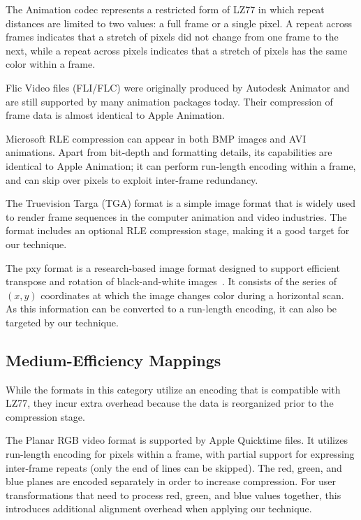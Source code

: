 The Animation codec represents a restricted form of LZ77 in which
repeat distances are limited to two values: a full frame or a single
pixel.  A repeat across frames indicates that a stretch of pixels did
not change from one frame to the next, while a repeat across pixels
indicates that a stretch of pixels has the same color within a frame.

Flic Video files (FLI/FLC) were originally produced by Autodesk
Animator and are still supported by many animation packages today.
Their compression of frame data is almost identical to Apple
Animation.

  Microsoft RLE compression can appear in
  both BMP images and AVI animations.  Apart from bit-depth and
  formatting details, its capabilities are identical to Apple
  Animation; it can perform run-length encoding within a frame, and
  can skip over pixels to exploit inter-frame redundancy.

 The Truevision Targa (TGA) format is a simple image
  format that is widely used to render frame sequences in the computer
  animation and video industries.  The format includes an optional RLE
  compression stage, making it a good target for our technique.

 The pxy format is a research-based image format
  designed to support efficient transpose and rotation of
  black-and-white images~\cite{shoji95}.  It consists of the series of
  $(x,y)$ coordinates at which the image changes color during a
  horizontal scan.  As this information can be converted to a
  run-length encoding, it can also be targeted by our technique.

\myend

\subsection*{Medium-Efficiency Mappings}
\label{sec:formats-med}

While the formats in this category utilize an encoding that is
compatible with LZ77, they incur extra overhead because the data is
reorganized prior to the compression stage.

\mybegin

 The Planar RGB video format is supported by
  Apple Quicktime files.  It utilizes run-length encoding for pixels
  within a frame, with partial support for expressing inter-frame
  repeats (only the end of lines can be skipped).  The red, green, and
  blue planes are encoded separately in order to increase compression.
  For user transformations that need to process red, green, and blue
  values together, this introduces additional alignment overhead when
  applying our technique.


